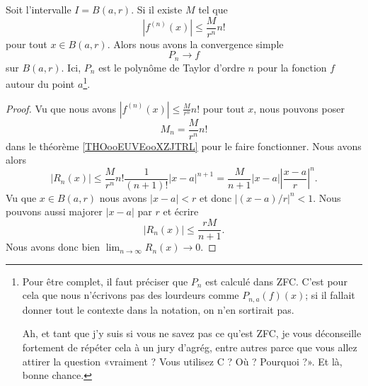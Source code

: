 \begin{proposition}
    Soit l'intervalle \( I=B(a,r)\). Si il existe \( M\) tel que 
    \begin{equation}
        | f^{(n)}(x) |\leq \frac{ M }{ r^n }n!
    \end{equation}
    pour tout \( x\in B(a,r)\). Alors nous avons la convergence simple
    \begin{equation}
        P_n\to f
    \end{equation}
    sur \( B(a,r)\). Ici, \( P_n\) est le polynôme de Taylor d'ordre \( n\) pour la fonction \( f\) autour du point \( a\)\footnote{Pour être complet, il faut préciser que \( P_n\) est calculé dans ZFC. C'est pour cela que nous n'écrivons pas des lourdeurs comme \( P_{n,a}(f)(x)\); si il fallait donner tout le contexte dans la notation, on n'en sortirait pas.

Ah, et tant que j'y suis si vous ne savez pas ce qu'est ZFC, je vous déconseille fortement de répéter cela à un jury d'agrég, entre autres parce que vous allez attirer la question «vraiment ? Vous utilisez C ? Où ? Pourquoi ?». Et là, bonne chance.}.
\end{proposition}

\begin{proof}
    Vu que nous avons \( | f^{(n)}(x) |\leq \frac{ M }{ r^n }n!\) pour tout \( x\), nous pouvons poser 
    \begin{equation}
        M_n=\frac{ M }{ r^n }n!
    \end{equation}
    dans le théorème \ref{THOooEUVEooXZJTRL} pour le faire fonctionner. Nous avons alors
    \begin{equation}
        | R_n(x) |\leq \frac{ M }{ r^n }n!\frac{1}{ (n+1)! }| x-a |^{n+1}=\frac{ M }{ n+1 }| x-a |\left| \frac{ x-a }{ r } \right|^n.
    \end{equation}
    Vu que \( x\in B(a,r)\) nous avons \( | x-a |<r\) et donc \( |(x-a)/r |^n<1\). Nous pouvons aussi majorer \( | x-a |\) par \( r\) et écrire
    \begin{equation}
        | R_n(x) |\leq \frac{ rM }{ n+1 }.
    \end{equation}
    Nous avons donc bien \( \lim_{n\to \infty} R_n(x)\to 0\).
\end{proof}
